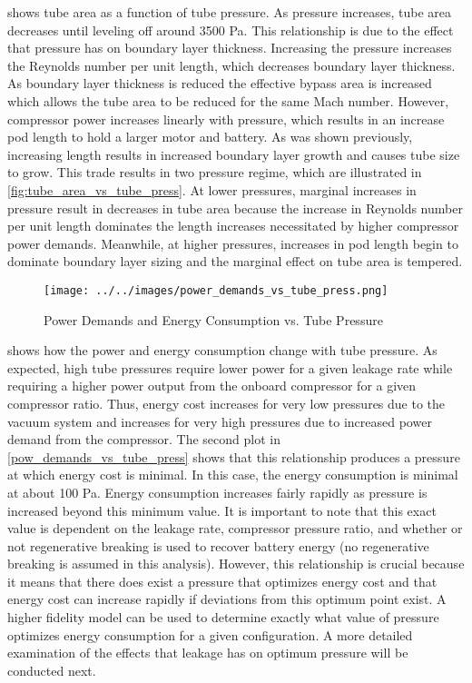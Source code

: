  shows tube area as a function of tube pressure. As pressure increases, tube area decreases until leveling off around 3500 Pa. This relationship is due to the effect that pressure has on boundary layer thickness. Increasing the pressure increases the Reynolds number per unit length, which decreases boundary layer thickness. As boundary layer thickness is reduced the effective bypass area is increased which allows the tube area to be reduced for the same Mach number. However, compressor power increases linearly with pressure, which results in an increase pod length to hold a larger motor and battery. As was shown previously, increasing length results in increased boundary layer growth and causes tube size to grow. This trade results in two pressure regime, which are illustrated in \cref{fig:tube_area_vs_tube_press}. At lower pressures, marginal increases in pressure result in decreases in tube area because the increase in Reynolds number per unit length dominates the length increases necessitated by higher compressor power demands. Meanwhile, at higher pressures, increases in pod length begin to dominate boundary layer sizing and the marginal effect on tube area is tempered. 
\begin{figure}
	\centering
	\texttt{[image: ../../images/power\_demands\_vs\_tube\_press.png]}
	\caption{Power Demands and Energy Consumption vs. Tube Pressure}
	\label{fig:pow_demands_vs_tube_press}
\end{figure}
 shows how the power and energy consumption change with tube pressure. As expected, high tube pressures require lower power for a given leakage rate while requiring a higher power output from the onboard compressor for a given compressor ratio. Thus, energy cost increases for very low pressures due to the vacuum system and increases for very high pressures due to increased power demand from the compressor. The second plot in \cref{pow_demands_vs_tube_press} shows that this relationship produces a pressure at which energy cost is minimal. In this case, the energy consumption is minimal at about 100 Pa. Energy consumption increases fairly rapidly as pressure is increased beyond this minimum value. It is important to note that this exact value is dependent on the leakage rate, compressor pressure ratio, and whether or not regenerative breaking is used to recover battery energy (no regenerative breaking is assumed in this analysis). However, this relationship is crucial because it means that there does exist a pressure that optimizes energy cost and that energy cost can increase rapidly if deviations from this optimum point exist. A higher fidelity model can be used to determine exactly what value of pressure optimizes energy consumption for a given configuration. A more detailed examination of the effects that leakage has on optimum pressure will be conducted next. 
